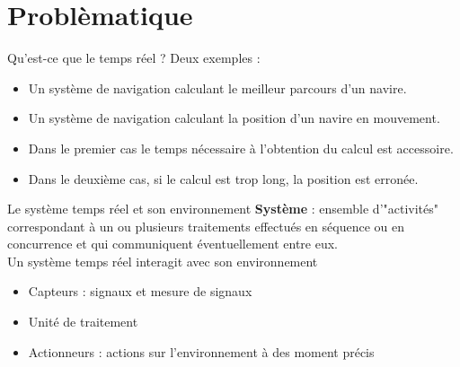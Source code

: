 %                                                                                       
%
%

\part{Problèmatique}



\begin{frame}{Qu'est-ce que le temps réel ?}
  Deux exemples :
  \begin{itemize} 
  \item Un  système de navigation calculant le  meilleur parcours d'un
    navire.
  \item Un système de navigation  calculant la position d'un navire en
    mouvement.
  \end{itemize}     
  \begin{itemize}
  \item  Dans le  premier cas  le  temps nécessaire  à l'obtention  du
    calcul est accessoire.
  \item Dans le deuxième cas, si  le calcul est trop long, la position
    est erronée.
  \end{itemize}
\end{frame}

\begin{frame}{Le système temps réel et son environnement}
  \textbf{Système}  :  ensemble d'"activités"  correspondant  à un  ou
  plusieurs traitements effectués en séquence ou en concurrence et qui
  communiquent  éventuellement entre eux.\\[3mm]

  Un système temps réel interagit avec son environnement
  \begin{itemize}
  \item Capteurs : signaux et mesure de signaux
  \item Unité de traitement
  \item Actionneurs : actions sur l'environnement à des moment précis
  \end{itemize}
\end{frame}

